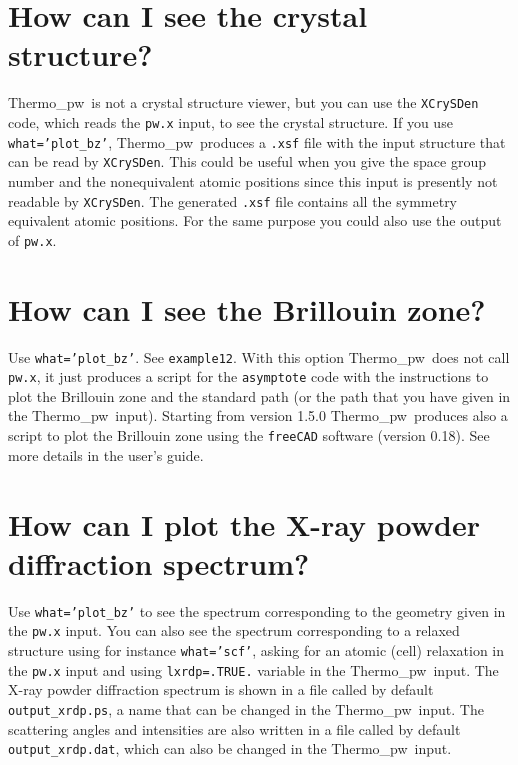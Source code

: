 \documentclass[12pt,a4paper,twoside]{report}
\def\thermo{{\sc Thermo}\_{\sc pw}}
\begin{document}
{\color{coral}\section{How can I see the crystal structure?}}
\color{black}
\thermo\ is not a crystal structure viewer, but you can use the
\texttt{XCrySDen} code, which reads the \texttt{pw.x} input, to
see the crystal structure. If you use \texttt{what='plot\_bz'}, 
\thermo\ produces a \texttt{.xsf} file with the input structure 
that can be read by \texttt{XCrySDen}. This could
be useful when you give the space group number and the nonequivalent
atomic positions since this input is presently not readable by 
\texttt{XCrySDen}.
The generated \texttt{.xsf} file contains all the symmetry equivalent 
atomic positions. For the same purpose you could also use the output
of \texttt{pw.x}.

\newpage

{\color{coral}\section{How can I see the Brillouin zone?}}
\color{black}
Use \texttt{what='plot\_bz'}. See \texttt{example12}. With this option
\thermo\ does not call \texttt{pw.x}, it just produces a script for
the \texttt{asymptote} code with the instructions to plot the Brillouin
zone and the standard path (or the path that you have given in the \thermo\ 
input). Starting from version 1.5.0 \thermo\ produces also a
script to plot the Brillouin zone using the \texttt{freeCAD} software
(version 0.18). See more details in the user's guide.


\newpage

{\color{coral}\section{How can I plot the X-ray powder diffraction spectrum?}}
\color{black}
Use \texttt{what='plot\_bz'} to see the spectrum corresponding to
the geometry given in the \texttt{pw.x} input. You can also see the
spectrum corresponding to a relaxed structure using for instance
\texttt{what='scf'}, asking for an atomic (cell) relaxation in the \texttt{pw.x}
input and using \texttt{lxrdp=.TRUE.} variable in the \thermo\ input.
The X-ray powder diffraction spectrum is shown in a file called by default
\texttt{output\_xrdp.ps}, a name that can be changed
in the \thermo\ input. The scattering angles and intensities
are also written in a file called by default \texttt{output\_xrdp.dat}, 
which can also be changed in the \thermo\ input.
\end{document}
